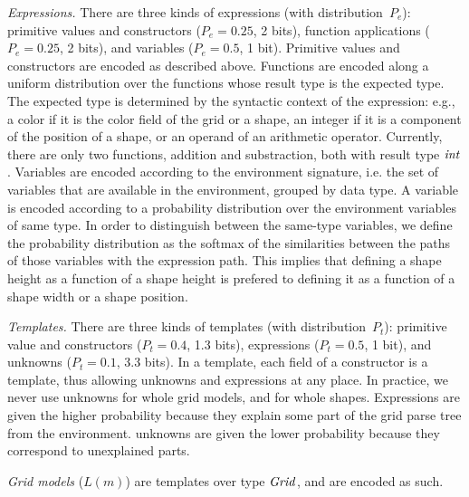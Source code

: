 \documentclass[a4paper]{llncs}
\begin{document}
{\em Expressions.} There are three kinds of expressions (with
distribution~$P_e$): primitive values and constructors ($P_e = 0.25$,
2 bits), function applications ($P_e = 0.25$, 2 bits), and variables
($P_e = 0.5$, 1 bit). Primitive values and constructors are encoded as
described above. Functions are encoded along a uniform distribution
over the functions whose result type is the expected type. The
expected type is determined by the syntactic context of the
expression: e.g., a color if it is the color field of the grid or a
shape, an integer if it is a component of the position of a shape, or
an operand of an arithmetic operator. Currently, there are only two
functions, addition and substraction, both with result type
${\it int}$. Variables are encoded according to the environment
signature, i.e. the set of variables that are available in the
environment, grouped by data type. A variable is encoded according to
a probability distribution over the environment variables of same
type. In order to distinguish between the same-type variables, we
define the probability distribution as the softmax of the similarities
between the paths of those variables with the expression path. This
implies that defining a shape height as a function of a shape height
is prefered to defining it as a function of a shape width or a shape
position.

{\em Templates.} There are three kinds of templates (with
distribution~$P_t$): primitive value and constructors ($P_t = 0.4$,
1.3 bits), expressions ($P_t = 0.5$, 1 bit), and unknowns
($P_t = 0.1$, 3.3 bits). In a template, each field of a constructor is
a template, thus allowing unknowns and expressions at any place. In
practice, we never use unknowns for whole grid models, and for whole
shapes. Expressions are given the higher probability because they
explain some part of the grid parse tree from the
environment. unknowns are given the lower probability because they
correspond to unexplained parts.

{\em Grid models} ($L(m)$) are templates over type ${\it Grid}$,
and are encoded as such.
\end{document}

